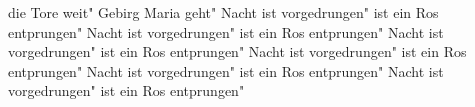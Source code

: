 \ifx\mxversion\undefined
  
  
  
  
\fi

%
\tableofcontents
\normalmusicsize
 die Tore weit"
 Gebirg Maria geht"
 Nacht ist vorgedrungen"
 ist ein Ros entprungen"
 Nacht ist vorgedrungen"
 ist ein Ros entprungen"
 Nacht ist vorgedrungen"
 ist ein Ros entprungen"
 Nacht ist vorgedrungen"
 ist ein Ros entprungen"
 Nacht ist vorgedrungen"
 ist ein Ros entprungen"
 Nacht ist vorgedrungen"
 ist ein Ros entprungen"

\bookbye